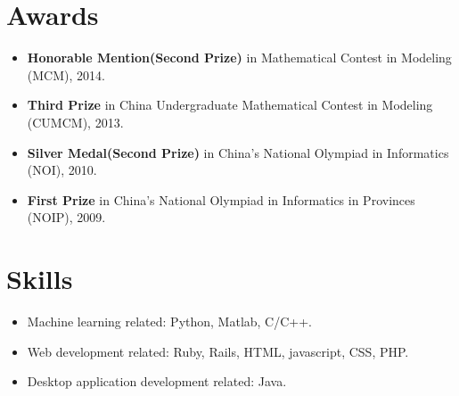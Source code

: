 \documentclass[letterpaper]{article}
\begin{document}
\section*{Awards}
\begin{itemize}
\item  \textbf{Honorable Mention(Second Prize)} in Mathematical Contest in Modeling (MCM), 2014.
\item  \textbf{Third Prize} in China Undergraduate Mathematical Contest in Modeling (CUMCM), 2013. 
\item  \textbf{Silver Medal(Second Prize)} in China's National Olympiad in Informatics (NOI), 2010. 
\item  \textbf{First Prize} in China's National Olympiad in Informatics in Provinces (NOIP), 2009. 
\end{itemize}

\section*{Skills}
\begin{itemize}
\item Machine learning related: Python, Matlab, C/C++.
\item Web development related: Ruby, Rails, HTML, javascript, CSS, PHP.
\item Desktop application development related: Java.
\end{itemize}
\end{document}
